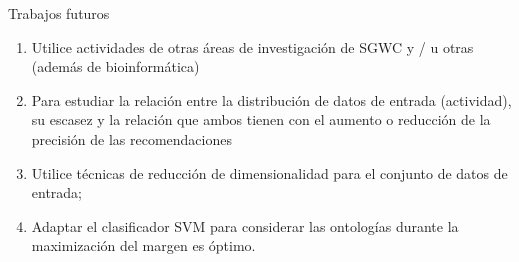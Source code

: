  
 \begin{frame}
 	\begin{block}{Trabajos futuros}
 		\begin{enumerate}
 			\item Utilice actividades de otras áreas de investigación de SGWC y / u otras (además de bioinformática)
 			\item Para estudiar la relación entre la distribución de datos de entrada (actividad), su escasez y la relación que ambos tienen con el aumento o reducción de la precisión de las recomendaciones
 			\item Utilice técnicas de reducción de dimensionalidad para el conjunto de datos de entrada;
 			\item Adaptar el clasificador SVM para considerar las ontologías durante la maximización del margen es óptimo.
 		\end{enumerate}		
 	\end{block}
 \end{frame}